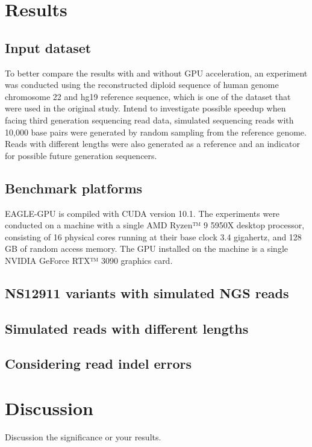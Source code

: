 \documentclass{PHlab-thesis}
\begin{document}
\chapter{Results}
\section{Input dataset}
To better compare the results with and without GPU acceleration, an experiment was conducted using the reconstructed diploid sequence of human genome chromosome 22 and hg19 reference sequence, which is one of the dataset that were used in the original study. Intend to investigate possible speedup when facing third generation sequencing read data, simulated sequencing reads with 10,000 base pairs were generated by random sampling from the reference genome. Reads with different lengths were also generated as a reference and an indicator for possible future generation sequencers.

\section{Benchmark platforms}
EAGLE-GPU is compiled with CUDA version 10.1. The experiments were conducted on a machine with a single AMD Ryzen™ 9 5950X desktop processor, consisting of 16 physical cores running at their base clock 3.4 gigahertz, and 128 GB of random access memory. The GPU installed on the machine is a single NVIDIA GeForce RTX™ 3090 graphics card.

\section{NS12911 variants with simulated NGS reads}

\section{Simulated reads with different lengths}

\section{Considering read indel errors}

\chapter{Discussion}
Discussion the significance or your results.
\end{document}
